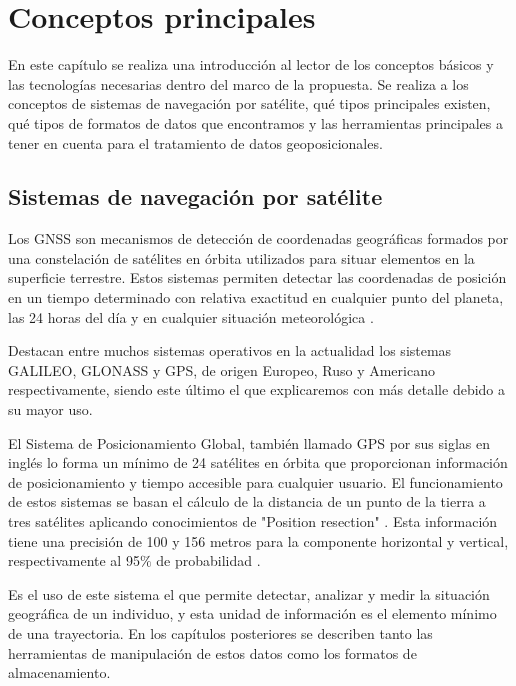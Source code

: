 

\chapter{Conceptos principales}

En este capítulo se realiza una introducción al lector de los conceptos básicos y las 
tecnologías necesarias dentro del marco de la propuesta. Se realiza a los conceptos de sistemas de 
navegación por satélite, qué tipos principales existen, qué tipos de formatos de 
datos que encontramos y las herramientas principales a tener en cuenta para el tratamiento de datos 
geoposicionales.

\section{Sistemas de navegación por satélite} \label{}
Los \ac{GNSS} son mecanismos de detección de coordenadas geográficas formados por una constelación 
de satélites en órbita utilizados para situar elementos en la superficie terrestre. Estos sistemas permiten 
detectar las coordenadas de posición en un tiempo determinado con relativa exactitud en cualquier
punto del planeta, las 24 horas del día y en cualquier situación meteorológica \cite{Garrido-Villen01}.

Destacan entre muchos sistemas operativos en la actualidad los sistemas GALILEO, GLONASS y GPS, de 
origen Europeo, Ruso y Americano respectivamente, siendo este último el que explicaremos con más detalle 
debido a su mayor uso.

El Sistema de Posicionamiento Global, también llamado \ac{GPS} por sus siglas en inglés 
lo forma un mínimo de 24 satélites en órbita que proporcionan información de posicionamiento y tiempo 
accesible para cualquier usuario. El funcionamiento de estos sistemas se basan el cálculo de la 
distancia de un punto de la tierra a tres satélites aplicando conocimientos de "Position resection" 
\cite{Langley01}.
Esta información tiene una precisión de 100 y 156 metros para la componente horizontal y vertical, 
respectivamente al 95$\%$ de probabilidad \cite{ElRabbany01}.

Es el uso de este sistema el que permite detectar, analizar y medir la situación geográfica de un individuo, y 
esta unidad de información es el elemento mínimo de una trayectoria. En los capítulos posteriores se 
describen tanto las herramientas de manipulación de estos datos como los formatos de almacenamiento.

